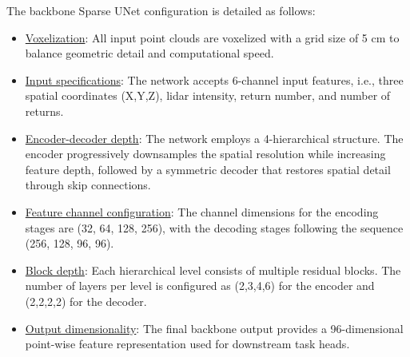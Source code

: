 \documentclass[review,authoryear]{elsarticle}
\begin{document}
The backbone Sparse UNet configuration is detailed as follows:

\begin{itemize}
    \item \underline{Voxelization}: All input point clouds are voxelized with a grid size of 5 cm to balance geometric detail and computational speed.
    \item \underline{Input specifications}: The network accepts 6-channel input features, i.e., three spatial coordinates (X,Y,Z), lidar intensity, return number, and number of returns.
    \item \underline{Encoder-decoder depth}: The network employs a 4-hierarchical structure. The encoder progressively downsamples the spatial resolution while increasing feature depth, followed by a symmetric decoder that restores spatial detail through skip connections.  
    \item \underline{Feature channel configuration}: The channel dimensions for the encoding stages are (32, 64, 128, 256), with the decoding stages following the sequence (256, 128, 96, 96).
    \item \underline{Block depth}: Each hierarchical level consists of multiple residual blocks. The number of layers per level is configured as (2,3,4,6) for the encoder and (2,2,2,2) for the decoder.
    \item \underline{Output dimensionality}: The final backbone output provides a 96-dimensional point-wise feature representation used for downstream task heads. 
\end{itemize}



\end{document}
